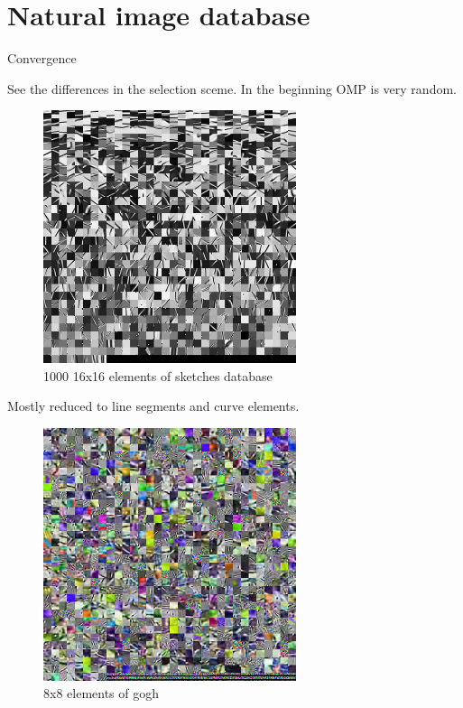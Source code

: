 \section{Natural image database}

Convergence

% 

See the differences in the selection sceme.
In the beginning OMP is very random.

\begin{figure}[h]
\centering
\includegraphics[width = 0.66\textwidth]{images/1000_sketches.png}
\caption{1000 16x16 elements of sketches database}
\label{fig:16_1000_lasso}
\end{figure}

Mostly reduced to line segments and curve elements.

\begin{figure}[h]
\centering
\includegraphics[width = 0.66\textwidth]{images/16_1000_1000_10_lasso.png}
\caption{8x8 elements of gogh}
\label{fig:16_1000_lasso}
\end{figure}

